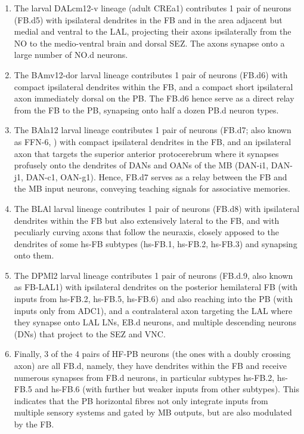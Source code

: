 \begin{enumerate}
                \item The larval DALcm12-v lineage (adult CREa1) contributes 1 pair of neurons (FB.d5) with ipsilateral dendrites in the FB and in the area adjacent but medial and ventral to the LAL, projecting their axons ipsilaterally from the NO to the medio-ventral brain and dorsal SEZ. The axons synapse onto a large number of NO.d neurons.

                \item The BAmv12-dor larval lineage contributes 1 pair of neurons (FB.d6) with compact ipsilateral dendrites within the FB, and a compact short ipsilateral axon immediately dorsal on the PB. The FB.d6 hence serve as a direct relay from the FB to the PB, synapsing onto half a dozen PB.d neuron types.

                \item The BAla12 larval lineage contributes 1 pair of neurons (FB.d7; also known as FFN-6, \citep{eschbach2021circuits}) with compact ipsilateral dendrites in the FB, and an ipsilateral axon that targets the superior anterior protocerebrum where it synapses profusely onto the dendrites of DANs and OANs of the MB (DAN-i1, DAN-j1, DAN-c1, OAN-g1). Hence, FB.d7 serves as a relay between the FB and the MB input neurons, conveying teaching signals for associative memories.

                \item The BLAl larval lineage contributes 1 pair of neurons (FB.d8) with ipsilateral dendrites within the FB but also extensively lateral to the FB, and with peculiarly curving axons that follow the neuraxis, closely apposed to the dendrites of some hs-FB subtypes (hs-FB.1, hs-FB.2, hs-FB.3) and synapsing onto them.

                \item The DPMl2 larval lineage contributes 1 pair of neurons (FB.d.9, also known as FB-LAL1) with ipsilateral dendrites on the posterior  hemilateral FB (with inputs from hs-FB.2, hs-FB.5, hs-FB.6) and also reaching into the PB (with inputs only from ADC1), and a contralateral axon targeting the LAL where they synapse onto LAL LNs, EB.d neurons, and multiple descending neurons (DNs) that project to the SEZ and VNC.

                \item Finally, 3 of the 4 pairs of HF-PB neurons (the ones with a doubly crossing axon) are all FB.d, namely, they have dendrites within the FB and receive numerous synapses from FB.d neurons, in particular subtypes hs-FB.2, hs-FB.5 and hs-FB.6 (with further but weaker inputs from other subtypes). This indicates that the PB horizontal fibres not only integrate inputs from multiple sensory systems and gated by MB outputs, but are also modulated by the FB.
            
            \end{enumerate}


